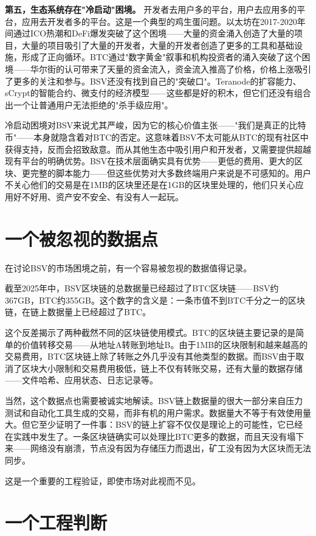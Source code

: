 \documentclass[a4paper,12pt,openany]{ctexbook}
\begin{document}
\textbf{第五，生态系统存在"冷启动"困境。} 开发者去用户多的平台，用户去应用多的平台，应用去开发者多的平台。这是一个典型的鸡生蛋问题。以太坊在2017-2020年间通过ICO热潮和DeFi爆发突破了这个困境——大量的资金涌入创造了大量的项目，大量的项目吸引了大量的开发者，大量的开发者创造了更多的工具和基础设施，形成了正向循环。BTC通过"数字黄金"叙事和机构投资者的涌入突破了这个困境——华尔街的认可带来了天量的资金流入，资金流入推高了价格，价格上涨吸引了更多的关注和参与。BSV还没有找到自己的"突破口"。Teranode的扩容能力、sCrypt的智能合约、微支付的经济模型——这些都是好的积木，但它们还没有组合出一个让普通用户无法拒绝的"杀手级应用"。

冷启动困境对BSV来说尤其严峻，因为它的核心价值主张——"我们是真正的比特币"——本身就隐含着对BTC的否定。这意味着BSV不太可能从BTC的现有社区中获得支持，反而会招致敌意。而从其他生态中吸引用户和开发者，又需要提供超越现有平台的明确优势。BSV在技术层面确实具有优势——更低的费用、更大的区块、更完整的脚本能力——但这些优势对大多数终端用户来说是不可感知的。用户不关心他们的交易是在1MB的区块里还是在1GB的区块里处理的，他们只关心应用好不好用、资产安不安全、有没有人一起玩。


\section*{一个被忽视的数据点}


在讨论BSV的市场困境之前，有一个容易被忽视的数据值得记录。

截至2025年中，BSV区块链的总数据量已经超过了BTC区块链——BSV约367GB，BTC约355GB。这个数字的含义是：一条市值不到BTC千分之一的区块链，在链上数据量上已经超过了BTC。

这个反差揭示了两种截然不同的区块链使用模式。BTC的区块链主要记录的是简单的价值转移交易——从地址A转账到地址B。由于1MB的区块限制和越来越高的交易费用，BTC区块链上除了转账之外几乎没有其他类型的数据。而BSV由于取消了区块大小限制和交易费用极低，链上不仅有转账交易，还有大量的数据存储——文件哈希、应用状态、日志记录等。

当然，这个数据点也需要被诚实地解读。BSV链上数据量的很大一部分来自压力测试和自动化工具生成的交易，而非有机的用户需求。数据量大不等于有效使用量大。但它至少证明了一件事：BSV的链上扩容不仅仅是理论上的可能性，它已经在实践中发生了。一条区块链确实可以处理比BTC更多的数据，而且天没有塌下来——网络没有崩溃，节点没有因为存储压力而退出，矿工没有因为大区块而无法同步。

这是一个重要的工程验证，即使市场对此视而不见。


\section*{一个工程判断}
\end{document}
